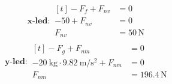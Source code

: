 \documentclass[11pt]{article}
\begin{document}
\begin{enumerate}[itemsep=2em]
\begin{minipage}[t]{0.5\textwidth}
                      \begin{align*}
                              \textbf{x-led}: \begin{aligned}[t]
                                                      -F_f + F_{nv} & = 0              \\
                                                      -50 + F_{nv}  & = 0              \\
                                                      F_{nv}        & = 50\,\mathrm{N}
                                              \end{aligned}
                      \end{align*}
                      \begin{align*}
                              \textbf{y-led}: \begin{aligned}[t]
                                                      -F_g + F_{nm}                                                        & = 0                 \\
                                                      -\SI{20}{\kilogram} \cdot \SI{9.82}{\meter/\second\squared} + F_{nm} & = 0                 \\
                                                      F_{nm}                                                               & = 196.4\,\mathrm{N}
                                              \end{aligned}
                      \end{align*}
              \end{minipage}
              \hfill
              \begin{adjustbox}{valign=t}
                      
              \end{adjustbox}


\end{enumerate}
\end{document}
